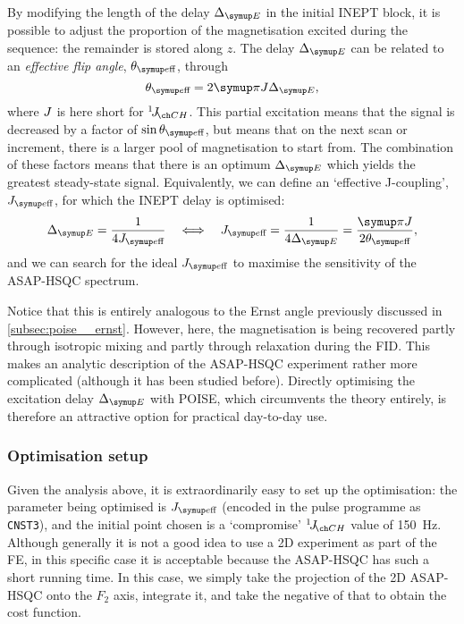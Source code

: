 By modifying the length of the delay $\DeltaE$ in the initial INEPT block, it is possible to adjust the proportion of the  magnetisation excited during the sequence: the remainder is stored along $z$.
The delay $\DeltaE$ can be related to an \textit{effective flip angle}, $\thetaeff$, through
\begin{equation}
    \label{eq:asaphsqc_ernst_angle}
    \thetaeff = 2\cpi J\DeltaE,
\end{equation}
where $J\/$ is here short for $\oneJ{CH}$.
This partial excitation means that the signal is decreased by a factor of $\sin\thetaeff$, but means that on the next scan or increment, there is a larger pool of  magnetisation to start from.
The combination of these factors means that there is an optimum $\DeltaE$ which yields the greatest steady-state signal.
Equivalently, we can define an `effective J-coupling', $\Jeff$, for which the INEPT delay is optimised:
\begin{equation}
    \label{eq:asaphsqc_j_eff}
    \DeltaE = \frac{1}{4\Jeff} \quad\Longleftrightarrow\quad \Jeff = \frac{1}{4\DeltaE} = \frac{\cpi J}{2\thetaeff},
\end{equation}
and we can search for the ideal $\Jeff$ to maximise the sensitivity of the ASAP-HSQC spectrum.

Notice that this is entirely analogous to the Ernst angle previously discussed in \cref{subsec:poise__ernst}.
However, here, the magnetisation is being recovered partly through isotropic mixing and partly through relaxation during the FID.
This makes an analytic description of the ASAP-HSQC experiment rather more complicated (although it has been studied before\autocite{Koos2019JMR}).
Directly optimising the excitation delay $\DeltaE$ with POISE, which circumvents the theory entirely, is therefore an attractive option for practical day-to-day use.


\subsubsection{Optimisation setup}

Given the analysis above, it is extraordinarily easy to set up the optimisation: the parameter being optimised is $\Jeff$ (encoded in the pulse programme as \texttt{CNST3}), and the initial point chosen is a `compromise' $\oneJ{CH}$ value of \qty{150}{\Hz}.
Although generally it is not a good idea to use a 2D experiment as part of the FE, in this specific case it is acceptable because the ASAP-HSQC has such a short running time.
In this case, we simply take the projection of the 2D ASAP-HSQC onto the $F_2$ axis, integrate it, and take the negative of that to obtain the cost function.

